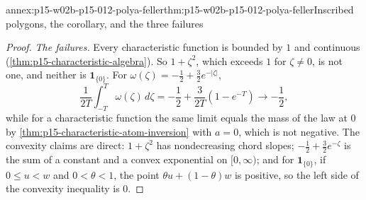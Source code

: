\begin{annexitem}{annex:p15-w02b-p15-012-polya-feller}{thm:p15-w02b-p15-012-polya-feller}{Inscribed polygons, the corollary, and the three failures}
\begin{proof}
\emph{The failures.} Every characteristic function is bounded by \(1\) and
continuous (\cref{thm:p15-characteristic-algebra}). So \(1+\zeta^2\), which
exceeds \(1\) for \(\zeta\neq0\), is not one, and neither is
\(\mathbf 1_{\{0\}}\). For \(\omega(\zeta)=-\frac12+\frac32e^{-|\zeta|}\),
\[
 \frac1{2T}\int_{-T}^T\omega(\zeta)\,d\zeta=-\frac12+\frac3{2T}(1-e^{-T})
   \longrightarrow-\frac12 ,
\]
while for a characteristic function the same limit equals the mass of the
law at \(0\) by \cref{thm:p15-characteristic-atom-inversion} with \(a=0\),
which is not negative. The convexity claims are direct: \(1+\zeta^2\) has
nondecreasing chord slopes; \(-\frac12+\frac32e^{-\zeta}\) is the sum of a
constant and a convex exponential on \([0,\infty)\); and for
\(\mathbf 1_{\{0\}}\), if \(0\leq u<w\) and \(0<\theta<1\), the point
\(\theta u+(1-\theta)w\) is positive, so the left side of the convexity
inequality is \(0\).
\end{proof}
\end{annexitem}

